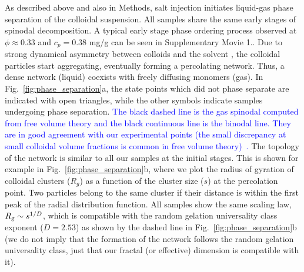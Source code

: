 \documentclass[preprint,amsmath,amssymb,superscriptaddress]{revtex4-1}
\begin{document}
As described above and also in Methods, salt injection initiates liquid-gas phase separation of the colloidal suspension. 
All samples share the same early stages of spinodal decomposition. 
A typical early stage phase ordering process observed at $\phi\approx 0.33$ and $c_p=0.38$ mg/g can be seen in Supplementary Movie 1.. 
Due to strong dynamical asymmetry between colloids and the solvent \cite{tanaka1999colloid}, the colloidal particles start aggregating, 
eventually forming a percolating network. Thus, a dense network (liquid) coexists with freely diffusing monomers (gas).
In Fig.~\ref{fig:phase_separation}a, the state points which did not phase separate are indicated with open triangles, while
the other symbols indicate samples undergoing phase separation. \textcolor{blue}{The black dashed line is the gas spinodal computed from free volume theory and the 
black continuous line is the binodal line. They are in good agreement with our experimental points (the small discrepancy at small colloidal volume fractions 
is common in free volume theory)~\cite{Royall2007,lu2008gelation}. }
The topology of the network is similar to all our samples at the initial stages. 
This is shown for example in Fig.~\ref{fig:phase_separation}b, where we plot the radius of gyration of colloidal clusters ($R_g$)
as a function of the cluster size ($s$) at the percolation point. Two particles belong to the same cluster if their distance is
within the first peak of the radial distribution function. All samples show the same scaling law, $R_{\rm g}\sim s^{1/D}$, which is compatible with
the random gelation universality class exponent ($D=2.53$) as shown by the dashed line in Fig.~\ref{fig:phase_separation}b
(we do not imply that the formation of the network follows the random gelation universality class, just that our
fractal (or effective) dimension is compatible with it).

 
\end{document}
